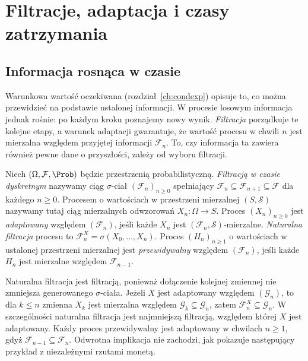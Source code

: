 \chapter{Filtracje, adaptacja i czasy zatrzymania}
\label{ch:filtracje}

\section{Informacja rosnąca w czasie}

Warunkowa wartość oczekiwana (rozdział~\ref{ch:condexp})
opisuje to, co można przewidzieć na podstawie ustalonej
informacji.
W procesie losowym informacja jednak rośnie:
po każdym kroku poznajemy nowy wynik. \emph{Filtracja}
porządkuje te kolejne etapy, a warunek adaptacji
gwarantuje, że wartość procesu w chwili $n$
jest mierzalna względem przyjętej informacji
$\mathcal F_n$. To, czy informacja ta zawiera
również pewne dane o przyszłości, zależy od
wyboru filtracji.

\begin{definicja}
Niech $(\Omega,\mathcal F,\Prob)$ będzie przestrzenią
probabilistyczną. \emph{Filtracją w czasie dyskretnym}
nazywamy ciąg $\sigma$-ciał
$(\mathcal F_n)_{n\geq0}$ spełniający
$\mathcal F_n\subseteq\mathcal F_{n+1}\subseteq\mathcal F$
dla każdego $n\geq0$.
Procesem o wartościach w przestrzeni mierzalnej
$(S,\mathcal S)$ nazywamy tutaj ciąg mierzalnych
odwzorowań $X_n:\Omega\to S$.
Proces $(X_n)_{n\geq0}$ jest \emph{adaptowany}
względem $(\mathcal F_n)$, jeśli każde $X_n$
jest $(\mathcal F_n,\mathcal S)$-mierzalne.
\emph{Naturalna filtracja} procesu to
$\mathcal F_n^X=\sigma(X_0,\ldots,X_n)$.
Proces $(H_n)_{n\geq1}$ o wartościach w ustalonej
przestrzeni mierzalnej jest \emph{przewidywalny}
względem $(\mathcal F_n)$, jeśli każde $H_n$
jest mierzalne względem $\mathcal F_{n-1}$.
\end{definicja}

\begin{uwaga}
Naturalna filtracja jest filtracją, ponieważ dołączenie
kolejnej zmiennej nie zmniejsza generowanego
$\sigma$-ciała. Jeżeli $X$ jest adaptowany względem
$(\mathcal G_n)$, to dla $k\leq n$ zmienna $X_k$
jest mierzalna względem $\mathcal G_k\subseteq\mathcal G_n$,
zatem $\mathcal F_n^X\subseteq\mathcal G_n$.
W szczególności naturalna filtracja jest najmniejszą
filtracją, względem której $X$ jest adaptowany.
Każdy proces przewidywalny jest adaptowany w chwilach
$n\geq1$, gdyż $\mathcal F_{n-1}\subseteq\mathcal F_n$.
Odwrotna implikacja nie zachodzi, jak pokazuje
następujący przykład z niezależnymi rzutami monetą.
\end{uwaga}

